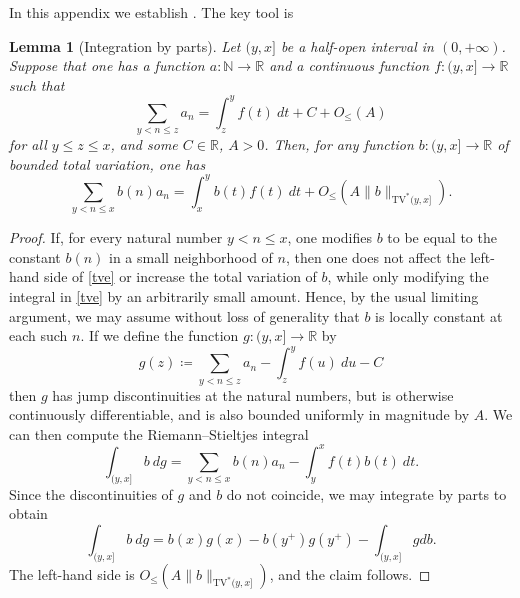 \documentclass[12pt,a4paper,reqno]{amsart}
\numberwithin{equation}{section}
\theoremstyle{plain}
\newtheorem{lemma}[theorem]{Lemma}
\theoremstyle{definition}
\newcommand\R{\mathbb{R}}
\newcommand\N{\mathbb{N}}
\begin{document}
In this appendix we establish .  The key tool is

\begin{lemma}[Integration by parts]\label{integ-lemma}  Let $(y,x]$ be a half-open interval in $(0,+\infty)$.  Suppose that one has a function $a \colon \N \to \R$ and a continuous function $f: (y,x] \to \R$ such that 
  $$ \sum_{y < n \leq z} a_n = \int_z^y f(t)\ dt + C + O_{\leq}(A)$$
  for all $y \leq z \leq x$, and some $C \in \R$, $A>0$.  Then, for any function $b: (y,x] \to \R$ of bounded total variation, one has
\begin{equation}\label{tve}
   \sum_{y < n \leq x} b(n) a_n = \int_x^y b(t) f(t)\ dt + O_{\leq}(A\|b\|_{\mathrm{TV}^*(y,x]}).
\end{equation}
\end{lemma}

\begin{proof}  If, for every natural number $y < n \leq x$, one modifies $b$ to be equal to the constant $b(n)$ in a small neighborhood of $n$, then one does not affect the left-hand side of \eqref{tve} or increase the total variation of $b$, while only modifying the integral in \eqref{tve} by an arbitrarily small amount.  Hence, by the usual limiting argument, we may assume without loss of generality that $b$ is locally constant at each such $n$.  If we define the function $g \colon (y,x] \to \R$ by
$$ g(z) \coloneqq  \sum_{y < n \leq z} a_n - \int_z^y f(u)\ du - C$$
then $g$ has jump discontinuities at the natural numbers, but is otherwise continuously differentiable, and is also bounded uniformly in magnitude by $A$.  We can then compute the Riemann--Stieltjes integral
$$ \int_{(y,x]} b\ dg = \sum_{y < n \leq x} b(n) a_n - \int_y^x f(t) b(t)\ dt.$$
Since the discontinuities of $g$ and $b$ do not coincide, we may integrate by parts to obtain
$$ \int_{(y,x]} b\ dg = b(x) g(x) - b(y^+) g(y^+) - \int_{(y,x]} g db.$$
The left-hand side is $O_{\leq}(A \|b\|_{\mathrm{TV}^*(y,x]})$, and the claim follows.
\end{proof}
\end{document}
